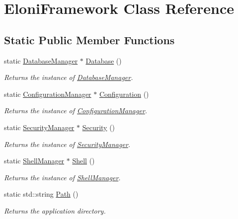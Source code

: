 \hypertarget{classEloniFramework}{\section{Eloni\-Framework Class Reference}
\label{classEloniFramework}
}
\subsection*{Static Public Member Functions}
\begin{DoxyCompactItemize}
\item 
static \hyperlink{classDatabaseManager}{Database\-Manager} $\ast$ \hyperlink{classEloniFramework_a803da824e33d75564d5a7ca77e66b0e4}{Database} ()
\begin{DoxyCompactList}\small\item\em Returns the instance of \hyperlink{classDatabaseManager}{Database\-Manager}. \end{DoxyCompactList}\item 
static \hyperlink{classConfigurationManager}{Configuration\-Manager} $\ast$ \hyperlink{classEloniFramework_a3ef2e10a4eae52e233931cff12aadb48}{Configuration} ()
\begin{DoxyCompactList}\small\item\em Returns the instance of \hyperlink{classConfigurationManager}{Configuration\-Manager}. \end{DoxyCompactList}\item 
static \hyperlink{classSecurityManager}{Security\-Manager} $\ast$ \hyperlink{classEloniFramework_a417d0368e8e814f717a2b210496f7db2}{Security} ()
\begin{DoxyCompactList}\small\item\em Returns the instance of \hyperlink{classSecurityManager}{Security\-Manager}. \end{DoxyCompactList}\item 
static \hyperlink{classShellManager}{Shell\-Manager} $\ast$ \hyperlink{classEloniFramework_ac0bcb257424435f01d2da61a816db01a}{Shell} ()
\begin{DoxyCompactList}\small\item\em Returns the instance of \hyperlink{classShellManager}{Shell\-Manager}. \end{DoxyCompactList}\item 
static std\-::string \hyperlink{classEloniFramework_a97ba3c1e7eed84a52a572794c6f78eab}{Path} ()
\begin{DoxyCompactList}\small\item\em Returns the application directory. \end{DoxyCompactList}\end{DoxyCompactItemize}


